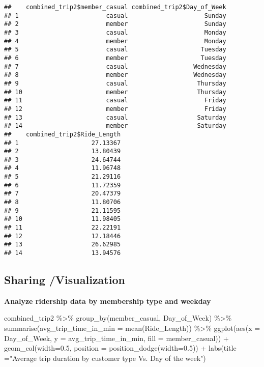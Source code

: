 \documentclass[
]{article}
\newenvironment{Shaded}{\begin{snugshade}}{\end{snugshade}}
\newcommand{\AttributeTok}[1]{\textcolor[rgb]{0.77,0.63,0.00}{#1}}
\newcommand{\FloatTok}[1]{\textcolor[rgb]{0.00,0.00,0.81}{#1}}
\newcommand{\FunctionTok}[1]{\textcolor[rgb]{0.00,0.00,0.00}{#1}}
\newcommand{\NormalTok}[1]{#1}
\newcommand{\SpecialCharTok}[1]{\textcolor[rgb]{0.00,0.00,0.00}{#1}}
\newcommand{\StringTok}[1]{\textcolor[rgb]{0.31,0.60,0.02}{#1}}
\begin{document}
\begin{verbatim}
##    combined_trip2$member_casual combined_trip2$Day_of_Week
## 1                        casual                     Sunday
## 2                        member                     Sunday
## 3                        casual                     Monday
## 4                        member                     Monday
## 5                        casual                    Tuesday
## 6                        member                    Tuesday
## 7                        casual                  Wednesday
## 8                        member                  Wednesday
## 9                        casual                   Thursday
## 10                       member                   Thursday
## 11                       casual                     Friday
## 12                       member                     Friday
## 13                       casual                   Saturday
## 14                       member                   Saturday
##    combined_trip2$Ride_Length
## 1                    27.13367
## 2                    13.80439
## 3                    24.64744
## 4                    11.96748
## 5                    21.29116
## 6                    11.72359
## 7                    20.47379
## 8                    11.80706
## 9                    21.11595
## 10                   11.98405
## 11                   22.22191
## 12                   12.18446
## 13                   26.62985
## 14                   13.94576
\end{verbatim}

\hypertarget{sharing-visualization}{%
\subsection{Sharing /Visualization}\label{sharing-visualization}}

\textbf{Analyze ridership data by membership type and weekday}

\begin{Shaded}
\begin{Highlighting}[]
\NormalTok{combined\_trip2 }\SpecialCharTok{\%\textgreater{}\%}  
  \FunctionTok{group\_by}\NormalTok{(member\_casual, Day\_of\_Week) }\SpecialCharTok{\%\textgreater{}\%} 
  \FunctionTok{summarise}\NormalTok{(}\AttributeTok{avg\_trip\_time\_in\_min =} \FunctionTok{mean}\NormalTok{(Ride\_Length)) }\SpecialCharTok{\%\textgreater{}\%}
  \FunctionTok{ggplot}\NormalTok{(}\FunctionTok{aes}\NormalTok{(}\AttributeTok{x =}\NormalTok{ Day\_of\_Week, }\AttributeTok{y =}\NormalTok{ avg\_trip\_time\_in\_min, }\AttributeTok{fill =}\NormalTok{ member\_casual)) }\SpecialCharTok{+}
  \FunctionTok{geom\_col}\NormalTok{(}\AttributeTok{width=}\FloatTok{0.5}\NormalTok{, }\AttributeTok{position =} \FunctionTok{position\_dodge}\NormalTok{(}\AttributeTok{width=}\FloatTok{0.5}\NormalTok{)) }\SpecialCharTok{+} 
  \FunctionTok{labs}\NormalTok{(}\AttributeTok{title =}\StringTok{"Average trip duration by customer type Vs. Day of the week"}\NormalTok{)}
\end{Highlighting}
\end{Shaded}
\end{document}
